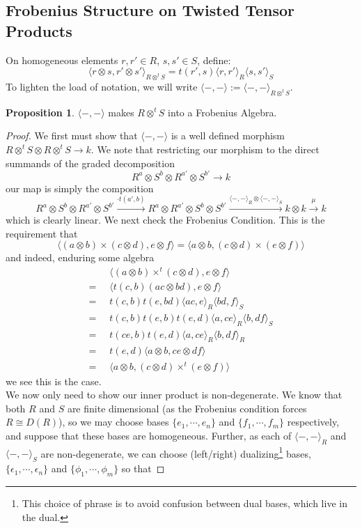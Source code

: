 \documentclass{article}
\theoremstyle{plain}
\theoremstyle{definition}
\newtheorem{proposition}[theorem]{Proposition}
\begin{document}
\subsection{Frobenius Structure on Twisted Tensor Products}
On homogeneous elements $r,r' \in R$, $s,s'\in S$, define:
$$\langle r \otimes s ,r' \otimes s' \rangle_{R\otimes^t S}= t(r',s)\langle r,r' \rangle_R \langle s, s' \rangle_S$$
To lighten the load of notation, we will write $\langle-,- \rangle := \langle -,- \rangle_{R \otimes^t S}$. 
\begin{proposition} $\langle-,- \rangle$ makes $R \otimes^t S$ into a Frobenius Algebra. \end{proposition}
\begin{proof} We first must show that $ \langle-,- \rangle$ is a well defined morphism $R \otimes^t S \otimes R \otimes^t S \rightarrow k$. We note that restricting our morphism to the direct summands of the graded decomposition
$$R^{a} \otimes S^{b} \otimes R^{a'} \otimes S^{b'} \rightarrow k$$
our map is simply the composition
$$R^{a} \otimes S^{b} \otimes R^{a'} \otimes S^{b'} \xrightarrow{\cdot t(a',b)} R^{a} \otimes R^{a'} \otimes S^{b} \otimes S^{b'} \xrightarrow{\langle-,-\rangle_R \otimes\langle -,- \rangle_S} k\otimes k \xrightarrow{\mu} k$$
which is clearly linear. 
We next check the Frobenius Condition. This is the requirement that
$$ \langle (a \otimes b) \times (c\otimes d), e \otimes f \rangle = \langle a \otimes b, (c \otimes d) \times (e \otimes f)\rangle $$
and indeed, enduring some algebra
\begin{align*}&\langle ( a \otimes b ) \times^t (c \otimes d ), e \otimes f\rangle\\
= \;\;&\langle t(c,b)(ac \otimes bd), e\otimes f\rangle \\
=\;\;&t(c,b)t(e,bd)\langle ac, e \rangle_R \langle bd, f \rangle_S\\
=\;\;&t(c,b)t(e,b)t(e,d)\langle a, ce\rangle_R \langle b, df \rangle_S \\
= \;\;&t(ce,b)t(e,d)\langle a, ce \rangle_R \langle b, df \rangle_R \\
=\;\; & t(e,d) \langle a \otimes b, ce \otimes df\rangle \\
=\;\; & \langle a \otimes b, (c \otimes d) \times^t (e \otimes f)\rangle
\end{align*}
we see this is the case. \\[5pt]
We now only need to show our inner product is non-degenerate.
We know that both $R$ and $S$ are finite dimensional (as the Frobenius condition forces $R \cong D(R)$), so we may choose bases $\{ e_1,\cdots, e_n\}$ and $\{f_1, \cdots, f_m\}$ respectively, and suppose that these bases are homogeneous. Further, as each of $\langle -,- \rangle_R$ and $\langle -,- \rangle_S$ are non-degenerate, we can choose (left/right) dualizing\footnote{This choice of phrase is to avoid confusion between dual bases, which live in the dual.} bases, $\{\epsilon_1, \cdots, \epsilon_n\}$ and $\{ \phi_1, \cdots, \phi_m\}$ so that

\end{proof}
\end{document}
